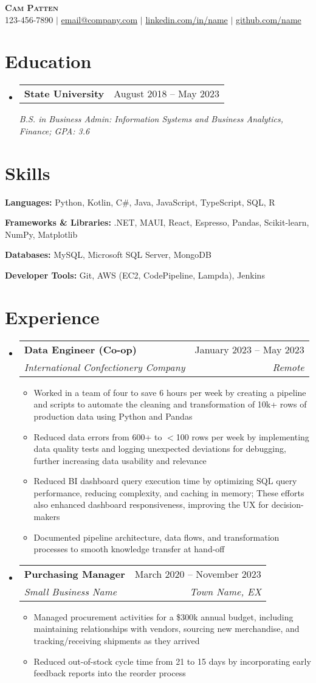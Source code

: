 \documentclass[letterpaper,11pt]{article}
\makeatletter
\newcommand{\bulletpoint}[1]{
  \item\small{
    {#1 \vspace{-2pt}}
  }
}
\newcommand{\heading}[8]{
    \begin{center}
        \textbf{\Huge \scshape #1} \\ \vspace{1pt}
        \small #2 $|$ \href{#3}{#4} $|$  \href{#5}{#6} $|$ \href{#7}{#8}
    \end{center}
}
\newcommand{\education}[3]{
    \vspace{-2pt}\item
    \begin{tabular*}{\textwidth}[t]{l@{\extracolsep{\fill}}r}
        \textbf{#1} & #2 \\
    \end{tabular*}
    \textit{\small#3} \vspace{-7pt}
}
\newcommand{\job}[4]{
    \vspace{-2pt}\item
    \begin{tabular*}{\textwidth}[t]{l@{\extracolsep{\fill}}r}
        \textbf{#1} & #2 \\
        \textit{\small#3} & \textit{\small #4} \\
    \end{tabular*}\vspace{-7pt}
}
\newcommand{\skill}[2]{
    \small{\item{
        \textbf{#1:} #2 \vspace{-9pt}
    }}
}
\newcommand{\educationListStart}{\begin{itemize}[leftmargin=0.00in, label={}]}
\newcommand{\educationListEnd}{\end{itemize}}
\newcommand{\skillliststart}{\begin{itemize}[leftmargin=0.00in, label={}]}
\newcommand{\skilllistend}{\end{itemize}}
\newcommand{\jobliststart}{\begin{itemize}[leftmargin=0.00in, label={}]}
\newcommand{\joblistend}{\end{itemize}}
\newcommand{\bulletpointListStart}{\begin{itemize}}
\newcommand{\bulletpointListEnd}{\end{itemize}\vspace{-5pt}}
\makeatother
\begin{document}
\heading
    {Cam Patten}
    {123-456-7890} 
    {mailto:email@company.com}
    {email@company.com}
    {https://www.linkedin.com/in/name/}
    {linkedin.com/in/name}
    {https://github.com/name}
    {github.com/name}
    
\section{Education}
    \educationListStart
        \education
        {State University}
        {August 2018 -- May 2023}
        {B.S. in Business Admin: Information Systems and Business Analytics, Finance; GPA:  3.6}
    \educationListEnd

\section{Skills}
    \skillliststart
        \skill 
        {Languages}
        {Python, Kotlin, C\#, Java, JavaScript, TypeScript, SQL, R}
        \skill 
        {Frameworks \& Libraries}
        {.NET, MAUI, React, Espresso, Pandas, Scikit-learn, NumPy, Matplotlib}
        \skill 
        {Databases}
        {MySQL, Microsoft SQL Server, MongoDB}
        \skill
        {Developer Tools}
        {Git, AWS (EC2, CodePipeline, Lampda), Jenkins}
    \skilllistend

\section{Experience}
    \jobliststart
        \job
        {Data Engineer (Co-op)}
        {January 2023 -- May 2023}
        {International Confectionery Company}
        {Remote}
        \bulletpointListStart
            \bulletpoint{Worked in a team of four to save 6 hours per week by creating a pipeline and scripts to automate the cleaning and transformation of 10k+ rows of production data using Python and Pandas}
            \bulletpoint{Reduced data errors from 600+ to $<$100 rows per week by implementing data quality tests and logging unexpected deviations for debugging, further increasing data usability and relevance} 
            \bulletpoint{Reduced BI dashboard query execution time by optimizing SQL query performance, reducing complexity, and caching in memory; These efforts also enhanced dashboard responsiveness, improving the UX for decision-makers}
            \bulletpoint{Documented pipeline architecture, data flows, and transformation processes to smooth knowledge transfer at hand-off}
        \bulletpointListEnd
        \job
        {Purchasing Manager}
        {March 2020 -- November 2023}
        {Small Business Name}
        {Town Name, EX}
        \bulletpointListStart
            \bulletpoint{Managed procurement activities for a \$300k annual budget, including maintaining relationships with vendors, sourcing new merchandise, and tracking/receiving shipments as they arrived} 
            \bulletpoint{Reduced out-of-stock cycle time from 21 to 15 days by incorporating early feedback reports into the reorder process} 
        \bulletpointListEnd
    \joblistend
\end{document}

